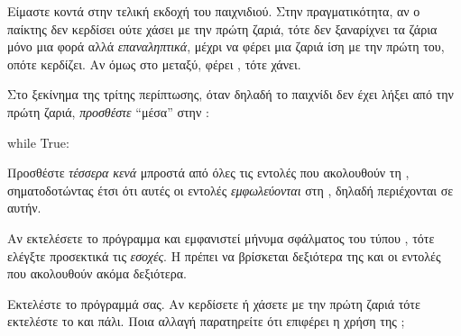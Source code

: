 \documentclass[a4paper,11pt,oneside]{book}
\begin{document}

Είμαστε κοντά στην τελική εκδοχή του παιχνιδιού. Στην πραγματικότητα, αν ο παίκτης δεν κερδίσει ούτε χάσει με την πρώτη ζαριά, τότε δεν ξαναρίχνει τα ζάρια μόνο μια φορά αλλά \emph{επαναληπτικά}, μέχρι να φέρει μια ζαριά ίση με την πρώτη του, οπότε κερδίζει. Αν όμως στο μεταξύ, φέρει , τότε χάνει.


\begin{step}
Στο ξεκίνημα της τρίτης περίπτωσης, όταν δηλαδή το παιχνίδι δεν έχει λήξει από την πρώτη ζαριά, %
\emph{προσθέστε} ``μέσα'' στην :

\begin{pynew}
while True:
\end{pynew}

Προσθέστε \emph{τέσσερα κενά} μπροστά από όλες τις εντολές που ακολουθούν τη , σηματοδοτώντας έτσι ότι αυτές οι εντολές \emph{εμφωλεύονται} στη , δηλαδή περιέχονται σε αυτήν.

\marginnote[16pt]{\iconcaution}
Αν εκτελέσετε το πρόγραμμα και εμφανιστεί μήνυμα σφάλματος του τύπου , τότε ελέγξτε προσεκτικά τις \emph{εσοχές}. H  πρέπει να βρίσκεται δεξιότερα της  και οι εντολές που ακολουθούν ακόμα δεξιότερα.

Εκτελέστε το πρόγραμμά σας. Αν κερδίσετε ή χάσετε με την πρώτη ζαριά τότε εκτελέστε το και πάλι. Ποια αλλαγή παρατηρείτε ότι επιφέρει η χρήση της ;

\dottedline





\end{step}
\end{document}
